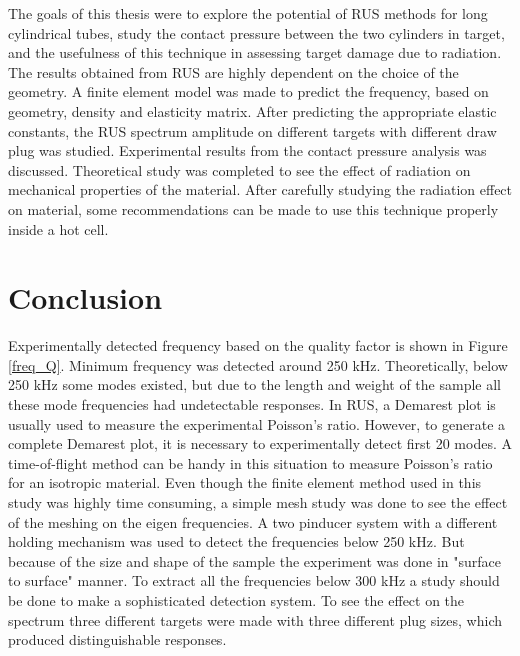 
\begin{doublespacing}
The goals of this thesis were to explore the potential of RUS methods for long cylindrical tubes, study the contact pressure between the two cylinders in target, and the usefulness of this technique in assessing target damage due to radiation. The results obtained from RUS are highly dependent on the choice of the geometry. A finite element model was made to predict the frequency, based on geometry, density and elasticity matrix. After predicting the appropriate elastic constants, the RUS spectrum amplitude on different targets with different draw plug was studied. Experimental results from the contact pressure analysis was discussed. Theoretical study was completed to see the effect of radiation on mechanical properties of the material. After carefully studying the radiation effect on material, some recommendations can be made to use this technique properly  inside a hot cell. 

\section{Conclusion}
Experimentally detected frequency based on the quality factor is shown in Figure \ref{freq_Q}. Minimum frequency was detected  around 250 kHz. Theoretically, below 250 kHz some modes existed, but due to the length and weight of the sample all these mode frequencies had undetectable responses. In RUS, a Demarest plot is usually used to measure the experimental Poisson's ratio. However, to generate a complete Demarest plot, it is necessary to experimentally  detect first 20 modes. A time-of-flight method can be handy in this situation to measure Poisson's ratio for an isotropic material. Even though the finite element method  used in this study was highly time consuming, a simple mesh study was done to see the effect of the meshing on the eigen frequencies. A two pinducer system with a different holding mechanism was used to detect the frequencies below 250 kHz. But because of the size and shape of the sample the experiment was done in "surface to surface" manner. To extract all the frequencies below 300 kHz a study should be done to make a sophisticated detection system. To see the effect on the spectrum three different targets were made with three different plug sizes, which produced distinguishable responses.%


\end{doublespacing}

